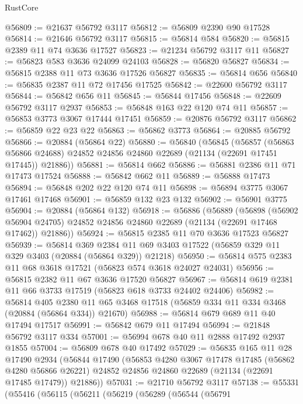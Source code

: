 \begin{lexlean}{RustCore}
\begin{coremodule}
@56809 := @21637 @56792 @3117
@56812 := @56809 @2390 @90 @17528
@56814 := @21646 @56792 @3117
@56815 := @56814 @584
@56820 := @56815 @2389 @11 @74 @3636 @17527
@56823 := @21234 @56792 @3117 @11
@56827 := @56823 @583 @3636 @24099 @24103
@56828 := @56820 @56827
@56834 := @56815 @2388 @11 @73 @3636 @17526 @56827
@56835 := @56814 @656
@56840 := @56835 @2387 @11 @72 @17456 @17525
@56842 := @22600 @56792 @3117
@56844 := @56842 @656 @11
@56845 := @56844 @17456
@56848 := @22609 @56792 @3117 @2937
@56853 := @56848 @163 @22 @120 @74 @11
@56857 := @56853 @3773 @3067 @17444 @17451
@56859 := @20876 @56792 @3117
@56862 := @56859 @22 @23 @22
@56863 := @56862 @3773
@56864 := @20885 @56792
@56866 := @20884 (@56864 @22)
@56880 := @56840
    (@56845
      (@56857
        (@56863 @56866 @24688)
        @24852
        @24856
        @24860
        @22689
        (@21134 (@22691 @17451 @17445))
        @21886))
@56881 := @56814 @662
@56886 := @56881 @2386 @11 @71 @17473 @17524
@56888 := @56842 @662 @11
@56889 := @56888 @17473
@56894 := @56848 @202 @22 @120 @74 @11
@56898 := @56894 @3775 @3067 @17461 @17468
@56901 := @56859 @132 @23 @132
@56902 := @56901 @3775
@56904 := @20884 (@56864 @132)
@56918 := @56886
    (@56889
      (@56898
        (@56902 @56904 @24705)
        @24852
        @24856
        @24860
        @22689
        (@21134 (@22691 @17468 @17462))
        @21886))
@56924 := @56815 @2385 @11 @70 @3636 @17523 @56827
@56939 := @56814
    @369
    @2384
    @11
    @69
    @3403
    @17522
    (@56859 @329 @11 @329 @3403 (@20884 (@56864 @329)) @21218)
@56950 := @56814 @575 @2383 @11 @68 @3618 @17521 (@56823 @574 @3618 @24027 @24031)
@56956 := @56815 @2382 @11 @67 @3636 @17520 @56827
@56967 := @56814 @619 @2381 @11 @66 @3733 @17519 (@56823 @618 @3733 @24402 @24406)
@56982 := @56814
    @405
    @2380
    @11
    @65
    @3468
    @17518
    (@56859 @334 @11 @334 @3468 (@20884 (@56864 @334)) @21670)
@56988 := @56814 @679 @689 @11 @40 @17494 @17517
@56991 := @56842 @679 @11 @17494
@56994 := @21848 @56792 @3117 @334
@57001 := @56994 @678 @40 @11 @2888 @17492 @2937 @1855
@57004 := @56809 @678 @40 @17492
@57029 := @56835
    @165
    @11
    @28
    @17490
    @2934
    (@56844
      @17490
      (@56853
        @4280
        @3067
        @17478
        @17485
        (@56862 @4280 @56866 @26221)
        @24852
        @24856
        @24860
        @22689
        (@21134 (@22691 @17485 @17479))
        @21886))
@57031 := @21710 @56792 @3117
@57138 := @55331
    (@55416
      (@56115
        (@56211
          (@56219
            (@56289
              (@56544
                (@56791

\end{coremodule}
\end{lexlean}
